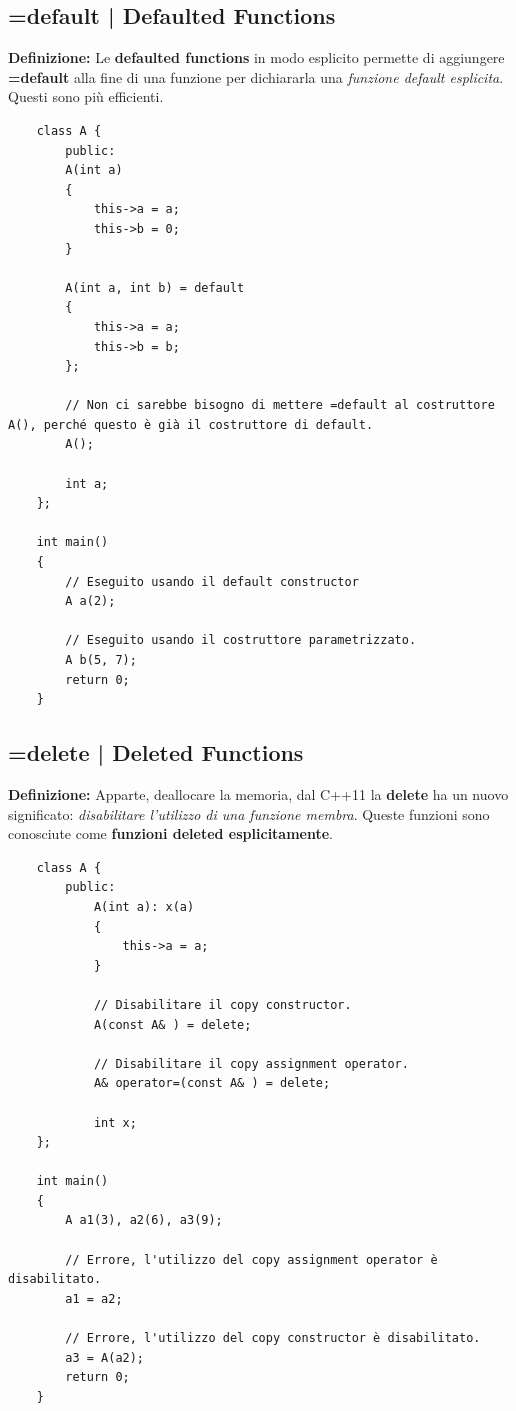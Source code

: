 \subsection{=default | Defaulted Functions}

\textsf{\small \textbf{Definizione: } Le \textbf{defaulted functions} in modo esplicito permette di aggiungere \textbf{=default} alla fine di una funzione per dichiararla una \emph{funzione default esplicita}. Questi sono più efficienti.} \\

\begin{lstlisting}
	class A {
		public:
		A(int a)
		{
			this->a = a;
			this->b = 0;
		}
	
		A(int a, int b) = default
		{
			this->a = a;
			this->b = b;
		};
	
		// Non ci sarebbe bisogno di mettere =default al costruttore A(), perché questo è già il costruttore di default.
		A(); 
		
		int a;
	};

	int main()
	{
		// Eseguito usando il default constructor
		A a(2);
		
		// Eseguito usando il costruttore parametrizzato.
		A b(5, 7);
		return 0;
	}
\end{lstlisting}

\subsection{=delete | Deleted Functions}

\textsf{\small \textbf{Definizione: } Apparte, deallocare la memoria, dal C++11 la \textbf{delete} ha un nuovo significato: \emph{disabilitare l'utilizzo di una funzione membra}. Queste funzioni sono conosciute come \textbf{funzioni deleted esplicitamente}.} \\

\begin{lstlisting}
	class A {
		public:
			A(int a): x(a)
			{
				this->a = a;
			}
		
			// Disabilitare il copy constructor.
			A(const A& ) = delete;
			
			// Disabilitare il copy assignment operator.
			A& operator=(const A& ) = delete;
			
			int x;
	};

	int main()
	{
		A a1(3), a2(6), a3(9);
		
		// Errore, l'utilizzo del copy assignment operator è disabilitato.
		a1 = a2;
		
		// Errore, l'utilizzo del copy constructor è disabilitato.
		a3 = A(a2);
		return 0;
	}
\end{lstlisting}

